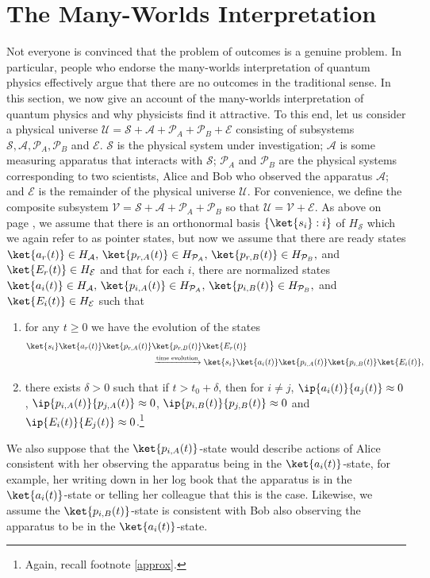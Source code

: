  
    \section{The Many-Worlds Interpretation}\label{manyworldsinterpretation1}
    Not everyone is convinced that the problem of outcomes is a genuine problem. In particular, people who endorse the many-worlds interpretation of quantum physics effectively argue that there are no outcomes in the traditional sense. In this section, we now give an account of the many-worlds interpretation of quantum physics and why physicists find it attractive. To this end, let us consider a physical universe $\mathcal{U}=\mathcal{S}+\mathcal{A}+\mathcal{P}_A+\mathcal{P}_B+\mathcal{E}$ consisting of subsystems $\mathcal{S}, \mathcal{A}, \mathcal{P}_A,\mathcal{P}_B$ and $\mathcal{E}$. $\mathcal{S}$ is the physical system under investigation; $\mathcal{A}$ is some measuring apparatus that interacts with $\mathcal{S}$; $\mathcal{P}_A$ and $\mathcal{P}_B$ are the physical systems corresponding to two scientists, Alice and Bob who observed the apparatus $\mathcal{A}$; and $\mathcal{E}$ is the remainder of the physical universe $\mathcal{U}$.  For convenience, we define the composite subsystem $\mathcal{V}=\mathcal{S}+\mathcal{A}+\mathcal{P}_A+\mathcal{P}_B$ so that $\mathcal{U}=\mathcal{V}+\mathcal{E}$. As above on page \pageref{pointer}, we  assume that there is an orthonormal basis $\{\ket{s_i}:i\}$ of $H_\mathcal{S}$ which we again refer to as pointer states, but now we assume that there are ready states $\ket{a_r(t)}\in H_\mathcal{A},\,\ket{p_{r, A}(t)}\in H_{\mathcal{P}_A},\,\ket{p_{r, B}(t)}\in H_{\mathcal{P}_B},$ and $\ket{E_r(t)}\in H_\mathcal{E}$ and that for each $i$, there are normalized states $\ket{a_i(t)}\in H_\mathcal{A},\,\ket{p_{i, A}(t)}\in H_{\mathcal{P}_A},\,\ket{p_{i, B}(t)}\in H_{\mathcal{P}_B},$ and $\ket{E_i(t)}\in H_\mathcal{E}$ such that 
    \begin{enumerate}[noitemsep, nosep, topsep=0pt]
    \item for any $t\geq 0$ we have the evolution of the states 
    \begin{align*}\ket{s_i}\ket{a_r(t)}\ket{p_{r, A}(t)}&\ket{p_{r, B}(t)}\ket{E_r(t)}\\ &\xrightarrow{\text{time evolution}}\ket{s_i}\ket{a_i(t)}\ket{p_{i, A}(t)}\ket{p_{i, B}(t)}\ket{E_i(t)},\end{align*}
    \item there exists $\delta>0$ such that if $t>t_0+\delta$, then for $i\neq j$, $\ip{a_i(t)}{a_j(t)}\approx 0$, $\ip{p_{i, A}(t)}{p_{j, A}(t)}\approx 0$, $\ip{p_{i, B}(t)}{p_{j, B}(t)}\approx 0$ and $\ip{E_i(t)}{E_j(t)}\approx 0$.\footnote{Again, recall footnote \ref{approx}.}
    \end{enumerate}
    We also suppose that the $\ket{p_{i,A}(t)}$-state would describe actions of Alice consistent with her observing the apparatus being in the $\ket{a_i(t)}$-state, for example, her writing down in her log book that the apparatus is in the $\ket{a_i(t)}$-state or telling her colleague that this is the case. Likewise, we assume the $\ket{p_{i,B}(t)}$-state is consistent with Bob also observing the apparatus to be in the $\ket{a_i(t)}$-state.
    
